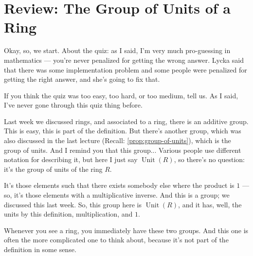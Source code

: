 \section{Review: The Group of Units of a Ring}

\begin{speech}[00:00:00 - 00:01:40]
Okay, so, we start. About the quiz: as I said, I'm very much pro-guessing in mathematics --- you're never penalized for getting the wrong answer. Lycka said that there was some implementation problem and some people were penalized for getting the right answer, and she's going to fix that.

If you think the quiz was too easy, too hard, or too medium, tell us. As I said, I've never gone through this quiz thing before.

Last week we discussed rings,  and associated to a ring, there is an additive group.  This is easy, this is part of the definition. But there's another group, which was also discussed in the last lecture (Recall: \cref{prop:group-of-units}), which is the group of units.  And I remind you that this group...  Various people use different notation for describing it, but here I just say $\operatorname{Unit}(R)$, so there's no question: it's the group of units of the ring $R$.

It's those elements such that there exists somebody else where the product is $1$  --- so, it's those elements with a multiplicative inverse. And this is a group; we discussed this last week. So, this group here is $\operatorname{Unit}(R)$, and it has, well, the units by this definition, multiplication, and $1$. 

Whenever you see a ring, you immediately have these two groups. And this one is often the more complicated one to think about, because it's not part of the definition in some sense.
\end{speech}


